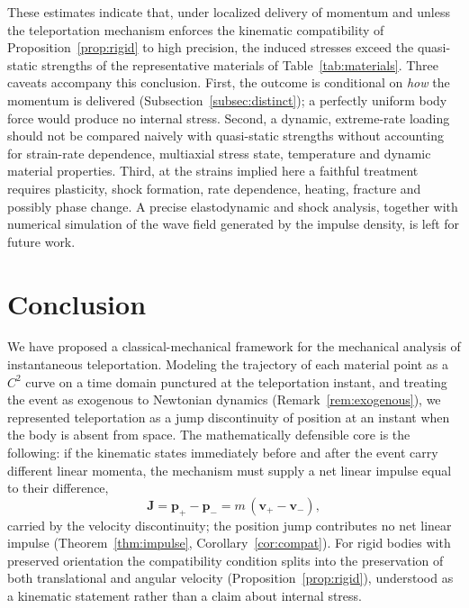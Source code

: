 \documentclass[11pt]{article}
\begin{document}
	These estimates indicate that, under localized delivery of momentum and
	unless the teleportation mechanism enforces the kinematic compatibility
	of Proposition~\ref{prop:rigid} to high precision, the induced stresses
	exceed the quasi-static strengths of the representative materials of
	Table~\ref{tab:materials}. Three caveats accompany this conclusion.
	First, the outcome is conditional on \emph{how} the momentum is
	delivered (Subsection~\ref{subsec:distinct}); a perfectly uniform body
	force would produce no internal stress. Second, a dynamic, extreme-rate
	loading should not be compared naively with quasi-static strengths
	without accounting for strain-rate dependence, multiaxial stress state,
	temperature and dynamic material properties. Third, at the strains
	implied here a faithful treatment requires plasticity, shock formation,
	rate dependence, heating, fracture and possibly phase change. A precise
	elastodynamic and shock analysis, together with numerical simulation of
	the wave field generated by the impulse density, is left for future
	work.
	
	\section{Conclusion}
	\label{sec:conclusion}
	
	We have proposed a classical-mechanical framework for the mechanical
	analysis of instantaneous teleportation. Modeling the trajectory of each
	material point as a $C^2$ curve on a time domain punctured at the
	teleportation instant, and treating the event as exogenous to Newtonian
	dynamics (Remark~\ref{rem:exogenous}), we represented teleportation as a
	jump discontinuity of position at an instant when the body is absent
	from space. The mathematically defensible core is the following: if the
	kinematic states immediately before and after the event carry different
	linear momenta, the mechanism must supply a net linear impulse equal to
	their difference,
	\[
	\mathbf J=\mathbf p_{+}-\mathbf p_{-}=m\,(\mathbf v_{+}-\mathbf v_{-}),
	\]
	carried by the velocity discontinuity; the position jump contributes no
	net linear impulse (Theorem~\ref{thm:impulse},
	Corollary~\ref{cor:compat}). For rigid bodies with preserved
	orientation the compatibility condition splits into the preservation of
	both translational and angular velocity
	(Proposition~\ref{prop:rigid}), understood as a kinematic statement
	rather than a claim about internal stress.
	
\end{document}
